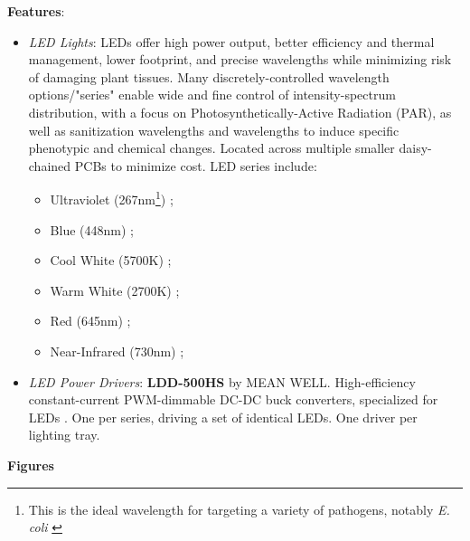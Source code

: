\textbf{Features}:
\begin{itemize}
    \item \textit{LED Lights}: LEDs offer high power output, better efficiency and thermal management, lower footprint, and precise wavelengths while minimizing risk of damaging plant tissues. Many discretely-controlled wavelength options/"series" enable wide and fine control of intensity-spectrum distribution, with a focus on Photosynthetically-Active Radiation (PAR), as well as sanitization wavelengths and wavelengths to induce specific phenotypic and chemical changes. Located across multiple smaller daisy-chained PCBs to minimize cost. LED series include:
    \begin{itemize}
        \item Ultraviolet (267nm\footnote{This is the ideal wavelength for targeting a variety of pathogens, notably \textit{E. coli} \cite{uvecoli}}) \cite{led_uv};
        \item Blue (448nm) \cite{led_xpg3};
        \item Cool White (5700K) \cite{led_xpg3};
        \item Warm White (2700K) \cite{led_xpg3};
        \item Red (645nm) \cite{led_xpg3};
        \item Near-Infrared (730nm) \cite{led_xpe2};
    \end{itemize}
    \item \textit{LED Power Drivers}: \textbf{LDD-500HS} by MEAN WELL. High-efficiency constant-current PWM-dimmable DC-DC buck converters, specialized for LEDs \cite{leddriver}. One per series, driving a set of identical LEDs. One driver per lighting tray.
\end{itemize}

\clearpage

\textbf{Figures}

